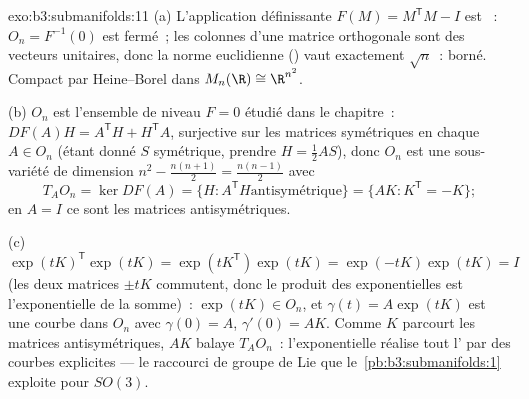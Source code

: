 \begin{solution}{exo:b3:submanifolds:11}
(a) L'application définissante $F(M) = M^{\mathsf T}M - I$
est ~: $O_n = F^{-1}(0)$ est fermé~; les colonnes
d'une matrice orthogonale sont des vecteurs unitaires, donc
la norme euclidienne () vaut exactement $\sqrt n$~:
borné. Compact par Heine--Borel dans $M_n(\R) \cong
\R^{n^2}$.

(b) $O_n$ est l'ensemble de niveau $F = 0$ étudié dans le
chapitre~: $DF(A)H = A^{\mathsf T}H + H^{\mathsf T}A$,
surjective sur les matrices symétriques en chaque $A \in
O_n$ (étant donné $S$ symétrique, prendre $H =
\frac12AS$), donc $O_n$ est une sous-variété de dimension
$n^2 - \frac{n(n+1)}2 = \frac{n(n-1)}2$ avec
\[
T_AO_n = \ker DF(A) = \{H : A^{\mathsf T}H \text{
antisymétrique}\} = \{AK : K^{\mathsf T} = -K\} ;
\]
en $A = I$ ce sont les matrices antisymétriques.

(c) $\exp(tK)^{\mathsf T}\exp(tK) = \exp(tK^{\mathsf T})
\exp(tK) = \exp(-tK)\exp(tK) = I$ (les deux matrices $\pm
tK$ commutent, donc le produit des exponentielles est
l'exponentielle de la somme)~: $\exp(tK) \in O_n$, et
$\gamma(t) = A\exp(tK)$ est une courbe dans $O_n$ avec
$\gamma(0) = A$, $\gamma'(0) = AK$. Comme $K$ parcourt les
matrices antisymétriques, $AK$ balaye $T_AO_n$~:
l'exponentielle réalise tout l' par des
courbes explicites --- le raccourci de groupe de Lie que
le~\cref{pb:b3:submanifolds:1} exploite pour $SO(3)$.
\end{solution}

